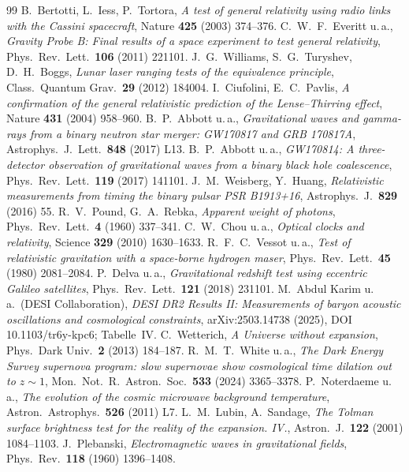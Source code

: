 \begin{thebibliography}{99}
 B.~Bertotti, L.~Iess, P.~Tortora, \textit{A test of general relativity using radio links with the Cassini spacecraft}, Nature \textbf{425} (2003) 374--376.
 C.~W.~F.~Everitt u.\,a., \textit{Gravity Probe B: Final results of a space experiment to test general relativity}, Phys.\ Rev.\ Lett.\ \textbf{106} (2011) 221101.
 J.~G.~Williams, S.~G.~Turyshev, D.~H.~Boggs, \textit{Lunar laser ranging tests of the equivalence principle}, Class.\ Quantum Grav.\ \textbf{29} (2012) 184004.
 I.~Ciufolini, E.~C.~Pavlis, \textit{A confirmation of the general relativistic prediction of the Lense--Thirring effect}, Nature \textbf{431} (2004) 958--960.
 B.~P.~Abbott u.\,a., \textit{Gravitational waves and gamma-rays from a binary neutron star merger: GW170817 and GRB 170817A}, Astrophys.\ J.\ Lett.\ \textbf{848} (2017) L13.
 B.~P.~Abbott u.\,a., \textit{GW170814: A three-detector observation of gravitational waves from a binary black hole coalescence}, Phys.\ Rev.\ Lett.\ \textbf{119} (2017) 141101.
 J.~M.~Weisberg, Y.~Huang, \textit{Relativistic measurements from timing the binary pulsar PSR B1913+16}, Astrophys.\ J.\ \textbf{829} (2016) 55.
 R.~V.~Pound, G.~A.~Rebka, \textit{Apparent weight of photons}, Phys.\ Rev.\ Lett.\ \textbf{4} (1960) 337--341.
 C.~W.~Chou u.\,a., \textit{Optical clocks and relativity}, Science \textbf{329} (2010) 1630--1633.
 R.~F.~C.~Vessot u.\,a., \textit{Test of relativistic gravitation with a space-borne hydrogen maser}, Phys.\ Rev.\ Lett.\ \textbf{45} (1980) 2081--2084.
 P.~Delva u.\,a., \textit{Gravitational redshift test using eccentric Galileo satellites}, Phys.\ Rev.\ Lett.\ \textbf{121} (2018) 231101.
 M.~Abdul Karim u.\,a.\ (DESI Collaboration), \textit{DESI DR2 Results II: Measurements of baryon acoustic oscillations and cosmological constraints}, arXiv:2503.14738 (2025), DOI 10.1103/tr6y-kpc6; Tabelle~IV.
 C.~Wetterich, \textit{A Universe without expansion}, Phys.\ Dark Univ.\ \textbf{2} (2013) 184--187.
 R.~M.~T.~White u.\,a., \textit{The Dark Energy Survey supernova program: slow supernovae show cosmological time dilation out to $z\sim1$}, Mon.\ Not.\ R.\ Astron.\ Soc.\ \textbf{533} (2024) 3365--3378.
 P.~Noterdaeme u.\,a., \textit{The evolution of the cosmic microwave background temperature}, Astron.\ Astrophys.\ \textbf{526} (2011) L7.
 L.~M.~Lubin, A.~Sandage, \textit{The Tolman surface brightness test for the reality of the expansion. IV.}, Astron.\ J.\ \textbf{122} (2001) 1084--1103.
 J.~Plebanski, \textit{Electromagnetic waves in gravitational fields}, Phys.\ Rev.\ \textbf{118} (1960) 1396--1408.
\end{thebibliography}
